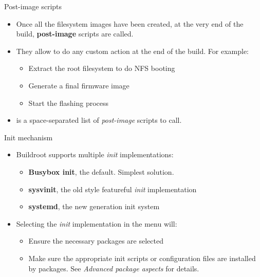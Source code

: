 \begin{frame}{Post-image scripts}
  \begin{itemize}
  \item Once all the filesystem images have been created, at the very
    end of the build, {\bf post-image} scripts are called.
  \item They allow to do any custom action at the end of the
    build. For example:
    \begin{itemize}
    \item Extract the root filesystem to do NFS booting
    \item Generate a final firmware image
    \item Start the flashing process
    \end{itemize}
  \item {} is a space-separated list
    of {\em post-image} scripts to call.
  \end{itemize}
\end{frame}

\begin{frame}{Init mechanism}
  \begin{itemize}
  \item Buildroot supports multiple {\em init} implementations:
    \begin{itemize}
    \item {\bf Busybox init}, the default. Simplest solution.
    \item {\bf sysvinit}, the old style featureful {\em init}
      implementation
    \item {\bf systemd}, the new generation init system
    \end{itemize}
  \item Selecting the {\em init} implementation in the  menu will:
    \begin{itemize}
    \item Ensure the necessary packages are selected
    \item Make sure the appropriate init scripts or configuration
      files are installed by packages. See {\em Advanced package
        aspects} for details.
    \end{itemize}
  \end{itemize}
\end{frame}

